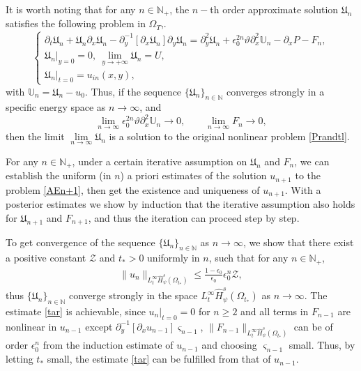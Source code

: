 \documentclass{amsart}
\numberwithin{equation}{section}
\begin{document}
It is worth noting that for any $n\in\mathbb{N}_{+}$, the $n-$th order approximate solution
 $\mathfrak{U}_{n}$ satisfies the following problem in $\Omega_{T}$,.
\begin{equation}\label{An}
\begin{cases}
\partial_{t}\mathfrak{U}_{n}
+\mathfrak{U}_{n}\partial_{x}\mathfrak{U}_{n}
-\partial_{y}^{-1}[\partial_{x}\mathfrak{U}_{n}]\partial_{y}\mathfrak{U}_{n}
=\partial_{y}^{2}\mathfrak{U}_{n}+\epsilon_{0}^{2n}\vartheta\partial_{x}^{2}\mathbb{U}_{n}-\partial_{x}P-F_{n},\\
\mathfrak{U}_{n}|_{y=0}=0,~\lim\limits_{y\to+\infty}\mathfrak{U}_{n}=U,\\
\mathfrak{U}_{n}|_{t=0}=u_{in}(x,y),
\end{cases}\tag{A$_n$}
\end{equation}
with $\mathbb{U}_{n}=\mathfrak{U}_{n}-u_{0}$.
Thus, if the sequence $\{\mathfrak{U}_{n}\}_{n\in\mathbb{N}}$ converges strongly in a specific energy space as $n\to\infty$, and
$$\lim_{n\to\infty}\epsilon_{0}^{2n}\vartheta\partial_{x}^{2}\mathbb{U}_{n}\to0, \qquad
\lim_{n\to\infty}F_{n}\to0,$$
then the limit $\lim\limits_{n\to\infty}\mathfrak{U}_{n}$ is a solution to the original nonlinear problem \eqref{Prandtl}.

For any $n\in\mathbb{N}_{+}$, under a certain iterative assumption on $\mathfrak{U}_{n}$ and $F_{n}$, we can establish the uniform (in $n$) a priori estimates of  the solution $u_{n+1}$ to the problem \eqref{AEn+1}, then get the existence and uniqueness of $u_{n+1}$. With a posterior estimates we show by induction that the iterative assumption also holds for $\mathfrak{U}_{n+1}$ and $F_{n+1}$, and thus the iteration can proceed step by step.

To get convergence of the sequence $\{\mathfrak{U}_{n}\}_{n\in\mathbb{N}}$ as $n\to\infty$, we show that there exist a positive constant $\mathcal{Z}$ and $t_{*}>0$ uniformly in $n$, such that for any $n\in\mathbb{N}_{+}$,
\begin{align}\label{tar}
\|u_{n}\|_{L_{t}^{\infty}\hat{H}_{\psi}^{s}(\Omega_{t_{*}})}\leq \frac{1-\epsilon_{0}}{\epsilon_{0}}\epsilon_{0}^{n}\mathcal{Z},
\end{align}
thus $\{\mathfrak{U}_{n}\}_{n\in\mathbb{N}}$ converge strongly in the space $L_{t}^{\infty}\hat{H}_{\psi}^{s}(\Omega_{t_{*}})$ as $n\to\infty$.
The estimate \eqref{tar} is achievable, since $u_{n}|_{t=0}=0$ for $n\geq 2$ and all terms in $F_{n-1}$ are nonlinear in $u_{n-1}$ except
$\partial_{y}^{-1}[\partial_{x}u_{n-1}]\varsigma_{n-1}$, $\|F_{n-1}\|_{L_{t}^{\infty}\hat{H}_{\psi}^{s}(\Omega_{t_{*}})}$ can be of order $\epsilon_{0}^{n}$ from the induction estimate of $u_{n-1}$ and choosing $\varsigma_{n-1}$ small. Thus, by letting $t_{*}$ small, the estimate \eqref{tar} can be fulfilled from that of $u_{n-1}$.
\end{document}

